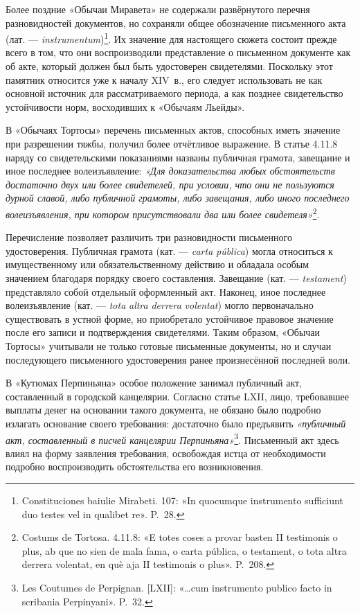 Более поздние «Обычаи Миравета» не содержали развёрнутого перечня разновидностей документов, но сохраняли общее обозначение письменного акта (лат. --- \emph{instrumentum})\footnote{Constituciones baiulie Mirabeti. 107: «In quocumque instrumento sufficiunt duo testes vel in qualibet re». P.~28.}. Их значение для настоящего сюжета состоит прежде всего в том, что они воспроизводили представление о письменном документе как об акте, который должен был быть удостоверен свидетелями. Поскольку этот памятник относится уже к началу XIV~в., его следует использовать не как основной источник для рассматриваемого периода, а как позднее свидетельство устойчивости норм, восходивших к «Обычаям Льейды».

В «Обычаях Тортосы» перечень письменных актов, способных иметь значение при разрешении тяжбы, получил более отчётливое выражение. В статье 4.11.8 наряду со свидетельскими показаниями названы публичная грамота, завещание и иное последнее волеизъявление: \emph{«Для доказательства любых обстоятельств достаточно двух или более свидетелей, при условии, что они не пользуются дурной славой, либо публичной грамоты, либо завещания, либо иного последнего волеизъявления, при котором присутствовали два или более свидетеля»}\footnote{Costums de Tortosa. 4.11.8: «E totes coses a provar basten II testimonis o plus, ab que no sien de mala fama, o carta pública, o testament, o tota altra derrera volentat, en què aja II testimonis o plus». P.~208.}.

Перечисление позволяет различить три разновидности письменного удостоверения. Публичная грамота (кат. --- \emph{carta}\emph{ }\emph{pública}) могла относиться к имущественному или обязательственному действию и обладала особым значением благодаря порядку своего составления. Завещание (кат. --- \emph{testament}) представляло собой отдельный оформленный акт. Наконец, иное последнее волеизъявление (кат. --- \emph{tota}\emph{ }\emph{altra}\emph{ }\emph{derrera}\emph{ }\emph{volentat}) могло первоначально существовать в устной форме, но приобретало устойчивое правовое значение после его записи и подтверждения свидетелями. Таким образом, «Обычаи Тортосы» учитывали не только готовые письменные документы, но и случаи последующего письменного удостоверения ранее произнесённой последней воли.

В «Кутюмах Перпиньяна» особое положение занимал публичный акт, составленный в городской канцелярии. Согласно статье LXII, лицо, требовавшее выплаты денег на основании такого документа, не обязано было подробно излагать основание своего требования: достаточно было предъявить \emph{«публичный акт, составленный в писчей канцелярии Перпиньяна»}\footnote{Les Coutumes de Perpignan. [LXII]: «…cum instrumento publico facto in scribania Perpinyani». P.~32.}. Письменный акт здесь влиял на форму заявления требования, освобождая истца от необходимости подробно воспроизводить обстоятельства его возникновения.


